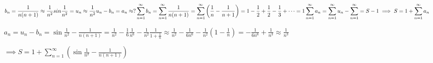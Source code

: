 \documentclass[a4paper]{article}
\begin{document}
        $\displaystyle
          b_n = \frac{1}{n(n + 1)} \approx \frac{1}{n^2} \\
          sin \frac{1}{n^2} = u_n \approx \frac{1}{n^2}  \\
          u_n - b_n = a_n \approx ? \\
          \sum_{n=1}^\infty b_n = \sum_{n=1}^\infty \frac{1}{n(n+1)} = \sum_{n=1}^\infty \left(\frac{1}{n} -
          \frac{1}{n+1}\right) = 1 - \frac{1}{2} + \frac{1}{2} - \frac{1}{3} + \dots = 1 \\
          \sum_{n=1}^\infty a_n = \sum_{n=1}^\infty u_n - \sum_{n=1}^\infty = S - 1 \implies S = 1 +
          \sum_{n=1}^\infty a_n
        $

        $\displaystyle
          a_n = u_n - b_n = \sin \frac{1}{n^2} - \frac{1}{n(n + 1)} = \frac{1}{n^2} - \frac{1}{6}\frac{1}{n^6}
          - \frac{1}{n^2}\frac{1}{1 + \frac{1}{n}} \approx \frac{1}{n^2} - \frac{1}{6n^6} - \frac{1}{n^2}
          \left(1 - \frac{1}{n}\right) = -\frac{1}{6n^6} + \frac{1}{n^3} \approx \frac{1}{n^3}
        $

        $\displaystyle
          \implies S = 1 + \sum_{n=1}^\infty\left(\sin \frac{1}{n^2} - \frac{1}{n(n + 1)}\right)
        $
\end{document}
